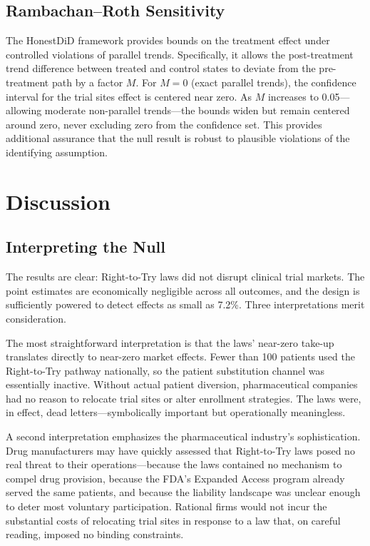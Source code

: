 \documentclass[12pt]{article}
\begin{document}
\subsection{Rambachan--Roth Sensitivity}

The \citet{rambachan2023more} HonestDiD framework provides bounds on the treatment effect under controlled violations of parallel trends. Specifically, it allows the post-treatment trend difference between treated and control states to deviate from the pre-treatment path by a factor $M$. For $M = 0$ (exact parallel trends), the confidence interval for the trial sites effect is centered near zero. As $M$ increases to 0.05---allowing moderate non-parallel trends---the bounds widen but remain centered around zero, never excluding zero from the confidence set. This provides additional assurance that the null result is robust to plausible violations of the identifying assumption.


\section{Discussion}\label{sec:discussion}

\subsection{Interpreting the Null}

The results are clear: Right-to-Try laws did not disrupt clinical trial markets. The point estimates are economically negligible across all outcomes, and the design is sufficiently powered to detect effects as small as 7.2\%. Three interpretations merit consideration.

The most straightforward interpretation is that the laws' near-zero take-up translates directly to near-zero market effects. Fewer than 100 patients used the Right-to-Try pathway nationally, so the patient substitution channel was essentially inactive. Without actual patient diversion, pharmaceutical companies had no reason to relocate trial sites or alter enrollment strategies. The laws were, in effect, dead letters---symbolically important but operationally meaningless.

A second interpretation emphasizes the pharmaceutical industry's sophistication. Drug manufacturers may have quickly assessed that Right-to-Try laws posed no real threat to their operations---because the laws contained no mechanism to compel drug provision, because the FDA's Expanded Access program already served the same patients, and because the liability landscape was unclear enough to deter most voluntary participation. Rational firms would not incur the substantial costs of relocating trial sites in response to a law that, on careful reading, imposed no binding constraints.
\end{document}
